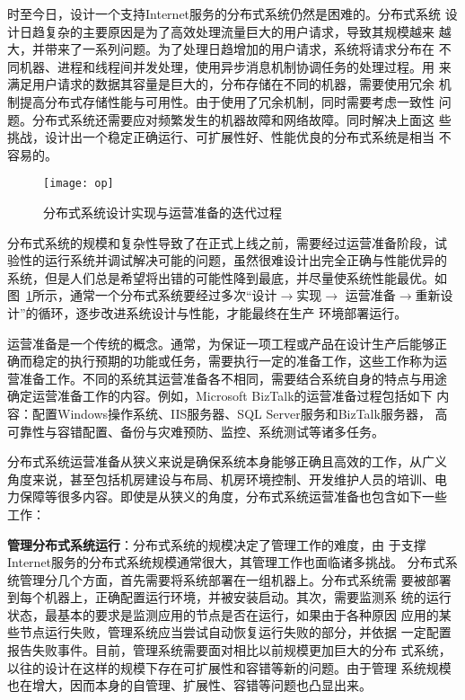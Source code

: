 
时至今日，设计一个支持Internet服务的分布式系统仍然是困难的。分布式系统
设计日趋复杂的主要原因是为了高效处理流量巨大的用户请求，导致其规模越来
越大，并带来了一系列问题。为了处理日趋增加的用户请求，系统将请求分布在
不同机器、进程和线程间并发处理，使用异步消息机制协调任务的处理过程。用
来满足用户请求的数据其容量是巨大的，分布存储在不同的机器，需要使用冗余
机制提高分布式存储性能与可用性。由于使用了冗余机制，同时需要考虑一致性
问题。分布式系统还需要应对频繁发生的机器故障和网络故障。同时解决上面这
些挑战，设计出一个稳定正确运行、可扩展性好、性能优良的分布式系统是相当
不容易的。

\begin{figure}[htbp]
\centering
\texttt{[image: op]}
\caption{分布式系统设计实现与运营准备的迭代过程}
\label{fig:op}
\end{figure}

分布式系统的规模和复杂性导致了在正式上线之前，需要经过运营准备阶段，试
验性的运行系统并调试解决可能的问题，虽然很难设计出完全正确与性能优异的
系统，但是人们总是希望将出错的可能性降到最底，并尽量使系统性能最优。如
图~\ref{fig:op}所示，通常一个分布式系统要经过多次“设计$\to$实现$\to$
运营准备$\to$重新设计”的循环，逐步改进系统设计与性能，才能最终在生产
环境部署运行。

运营准备是一个传统的概念。通常，为保证一项工程或产品在设计生产后能够正
确而稳定的执行预期的功能或任务，需要执行一定的准备工作，这些工作称为运
营准备工作。不同的系统其运营准备各不相同，需要结合系统自身的特点与用途
确定运营准备工作的内容。例如，Microsoft BizTalk的运营准备过程包括如下
内容：配置Windows操作系统、IIS服务器、SQL Server服务和BizTalk服务器，
高可靠性与容错配置、备份与灾难预防、监控、系统测试等诸多任务。

分布式系统运营准备从狭义来说是确保系统本身能够正确且高效的工作，从广义
角度来说，甚至包括机房建设与布局、机房环境控制、开发维护人员的培训、电
力保障等很多内容。即使是从狭义的角度，分布式系统运营准备也包含如下一些
工作：


\textbf{管理分布式系统运行}：分布式系统的规模决定了管理工作的难度，由
于支撑Internet服务的分布式系统规模通常很大，其管理工作也面临诸多挑战。
分布式系统管理分几个方面，首先需要将系统部署在一组机器上。分布式系统需
要被部署到每个机器上，正确配置运行环境，并被安装启动。其次，需要监测系
统的运行状态，最基本的要求是监测应用的节点是否在运行，如果由于各种原因
应用的某些节点运行失败，管理系统应当尝试自动恢复运行失败的部分，并依据
一定配置报告失败事件。目前，管理系统需要面对相比以前规模更加巨大的分布
式系统，以往的设计在这样的规模下存在可扩展性和容错等新的问题。由于管理
系统规模也在增大，因而本身的自管理、扩展性、容错等问题也凸显出来。

